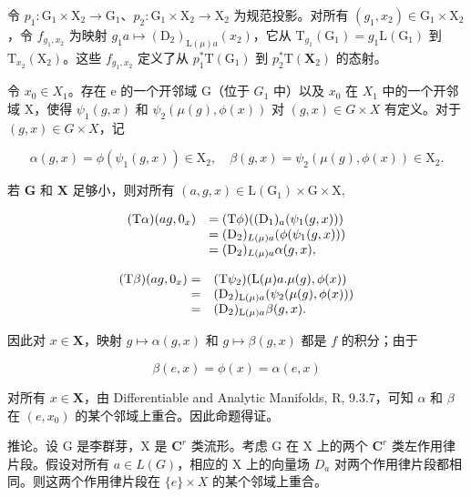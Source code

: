 令 \(p_1: \mathrm{G}_1 \times \mathrm{X}_2 \to \mathrm{G}_1\)、\(p_2: \mathrm{G}_1 \times \mathrm{X}_2 \to \mathrm{X}_2\) 为规范投影。对所有 \((g_1, x_2) \in \mathrm{G}_1 \times \mathrm{X}_2\)，令 \(f_{g_1, x_2}\) 为映射 \(g_1 a \mapsto (\mathrm{D}_2)_{\mathrm{L}(\mu)a}(x_2)\)，它从 \(\mathrm{T}_{g_1}(\mathrm{G}_1) = g_1\mathrm{L}(\mathrm{G}_1)\) 到 \(\mathrm{T}_{x_2}(\mathrm{X}_2)\)。这些 \(f_{g_1, x_2}\) 定义了从 \(p_1^* \mathrm{T}(\mathrm{G}_1)\) 到 \(p_2^* \mathrm{T}(\mathbf{X}_2)\) 的态射。

令 \(x_0 \in X_1\)。存在 e 的一个开邻域 G（位于 \(G_1\) 中）以及 \(x_0\) 在 \(X_1\) 中的一个开邻域 X，使得 \(\psi_1(g, x)\) 和 \(\psi_2(\mu(g), \phi(x))\) 对 \((g, x) \in G \times X\) 有定义。对于 \((g, x) \in G \times X\)，记

\[
\alpha (g, x) = \phi (\psi_ {1} (g, x)) \in \mathrm{X} _ {2}, \quad \beta (g, x) = \psi_ {2} (\mu (g), \phi (x)) \in \mathrm{X} _ {2}.
\]

若 \(\mathbf{G}\) 和 \(\mathbf{X}\) 足够小，则对所有 \((a,g,x)\in \mathrm{L}(\mathrm{G}_1)\times \mathrm{G}\times \mathrm{X},\)

\[
\begin{array}{r l} (\mathrm{T} \alpha) (a g, 0 _ {x}) & = (\mathrm{T} \phi) ((\mathrm{D} _ {1}) _ {a} (\psi_ {1} (g, x))) \\ & = (\mathrm{D} _ {2}) _ {L (\mu) a} (\phi (\psi_ {1} (g, x))) \\ & = (\mathrm{D} _ {2}) _ {L (\mu) a} \alpha (g, x), \end{array}
\]

\[
\begin{array}{r l} (\mathrm{T} \beta) (a g, 0 _ {x}) = & (\mathrm{T} \psi_ {2}) (\mathrm{L} (\mu) a. \mu (g), \phi (x)) \\ = & (\mathrm{D} _ {2}) _ {\mathrm{L} (\mu) a} (\psi_ {2} (\mu (g), \phi (x))) \\ = & (\mathrm{D} _ {2}) _ {\mathrm{L} (\mu) a} \beta (g, x). \end{array}
\]

因此对 \(x \in \mathbf{X}\)，映射 \(g \mapsto \alpha(g, x)\) 和 \(g \mapsto \beta(g, x)\) 都是 \(f\) 的积分；由于

\[
\beta (e, x) = \phi (x) = \alpha (e, x)
\]

对所有 \(x \in \mathbf{X}\)，由 Differentiable and Analytic Manifolds, R, 9.3.7，可知 \(\alpha\) 和 \(\beta\) 在 \((e, x_0)\) 的某个邻域上重合。因此命题得证。

推论。设 G 是李群芽，X 是 \(\mathbf{C}^{r}\) 类流形。考虑 G 在 X 上的两个 \(\mathbf{C}^{r}\) 类左作用律片段。假设对所有 \(a \in L(G)\)，相应的 X 上的向量场 \(D_{a}\) 对两个作用律片段都相同。则这两个作用律片段在 \(\{e\} \times X\) 的某个邻域上重合。

